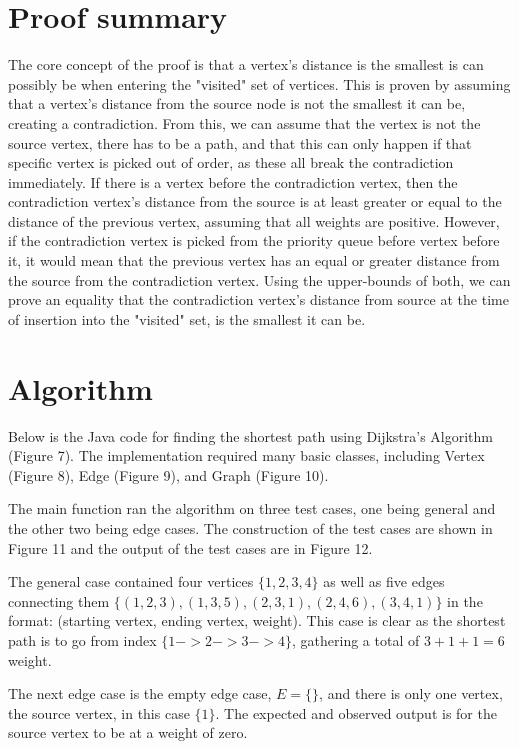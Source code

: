 \documentclass[12pt]{article}
\begin{document}
\section*{Proof summary}
The core concept of the proof is that a vertex's distance is the smallest is can possibly be when entering the "visited" set of vertices. This is proven by assuming that a vertex's distance from the source node is not the smallest it can be, creating a contradiction. From this, we can assume that the vertex is not the source vertex, there has to be a path, and that this can only happen if that specific vertex is picked out of order, as these all break the contradiction immediately. \hfill \break
If there is a vertex before the contradiction vertex, then the contradiction vertex's distance from the source is at least greater or equal to the distance of the previous vertex, assuming that all weights are positive. However, if the contradiction vertex is picked from the priority queue before vertex before it, it would mean that the previous vertex has an equal or greater distance from the source from the contradiction vertex. Using the upper-bounds of both, we can prove an equality that the contradiction vertex's distance from source at the time of insertion into the "visited" set, is the smallest it can be.

\section*{Algorithm}
Below is the Java code for finding the shortest path using Dijkstra's Algorithm (Figure 7). The implementation required many basic classes, including Vertex (Figure 8), Edge (Figure 9), and Graph (Figure 10).

The main function ran the algorithm on three test cases, one being general and the other two being edge cases. The construction of the test cases are shown in Figure 11 and the output of the test cases are in Figure 12.

The general case contained four vertices $\{1, 2, 3, 4\}$ as well as five edges connecting them $\{(1, 2, 3), (1, 3, 5), (2, 3, 1), (2, 4, 6), (3, 4, 1)\}$ in the format: (starting vertex, ending vertex, weight). This case is clear as the shortest path is to go from index $\{1 -> 2 -> 3 -> 4\}$, gathering a total of $3+1+1 = 6$ weight.

The next edge case is the empty edge case, $E=\{\}$, and there is only one vertex, the source vertex, in this case $\{1\}$. The expected and observed output is for the source vertex to be at a weight of zero.
\end{document}
